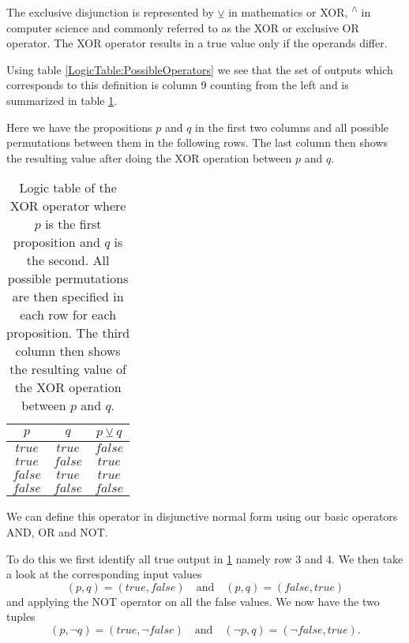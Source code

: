                 The exclusive disjunction is represented by $\veebar$ in mathematics or XOR, \textsuperscript{$\wedge$} in computer science and commonly referred to as the XOR or exclusive OR operator. The XOR operator results in a true value only if the operands differ.
                
                Using table \ref{LogicTable:PossibleOperators} we see that the set of outputs which corresponds to this definition is column 9 counting from the left and is summarized in table \ref{LogicTable:XOR}.
                
                Here we have the propositions $p$ and $q$ in the first two columns and all possible permutations between them in the following rows. The last column then shows the resulting value after doing the XOR operation between $p$ and $q$.
                
                \begin{table}[h!]
                    \centering
                    \begin{tabular}{|c|c|c|}
                    	\hline
                    	  $p$   &   $q$   & $p \veebar q$ \\ \hline
                    	$true$  & $true$  &    $false$    \\ \hline
                    	$true$  & $false$ &    $true$     \\ \hline
                    	$false$ & $true$  &    $true$     \\ \hline
                    	$false$ & $false$ &    $false$    \\ \hline
                    \end{tabular}
                    \caption{Logic table of the XOR operator where $p$ is the first proposition and $q$ is the second. All possible permutations are then specified in each row for each proposition. The third column then shows the resulting value of the XOR operation between $p$ and $q$.}
                    \label{LogicTable:XOR}
                \end{table}
            
                We can define this operator in disjunctive normal form using our basic operators AND, OR and NOT. 
                
                To do this we first identify all true output in \ref{LogicTable:XOR} namely row 3 and 4. We then take a look at the corresponding input values
                \begin{equation}
                (p,q) = (true, false) \quad \text{and} \quad (p,q) = (false, true)
                \end{equation}
                and applying the NOT operator on all the false values. We now have the two tuples
                \begin{equation}
                (p,\neg q) = (true, \neg false) \quad \text{and} \quad (\neg p, q) = (\neg false, true).
                \end{equation}
                
